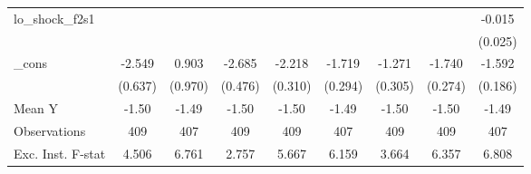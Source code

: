 {\begin{tabular}{l*{8}{c}}
\addlinespace
lo\_shock\_f2s1&                     &                     &                     &                     &                     &                     &                     &      -0.015         \\
            &                     &                     &                     &                     &                     &                     &                     &     (0.025)         \\
\addlinespace
\_cons      &      -2.549\sym{***}&       0.903         &      -2.685\sym{***}&      -2.218\sym{***}&      -1.719\sym{***}&      -1.271\sym{***}&      -1.740\sym{***}&      -1.592\sym{***}\\
            &     (0.637)         &     (0.970)         &     (0.476)         &     (0.310)         &     (0.294)         &     (0.305)         &     (0.274)         &     (0.186)         \\
\midrule
Mean Y      &       -1.50         &       -1.49         &       -1.50         &       -1.50         &       -1.49         &       -1.50         &       -1.50         &       -1.49         \\
Observations&         409         &         407         &         409         &         409         &         407         &         409         &         409         &         407         \\
Exc. Inst. F-stat&       4.506         &       6.761         &       2.757         &       5.667         &       6.159         &       3.664         &       6.357         &       6.808         \\
\bottomrule
\end{tabular}
}
